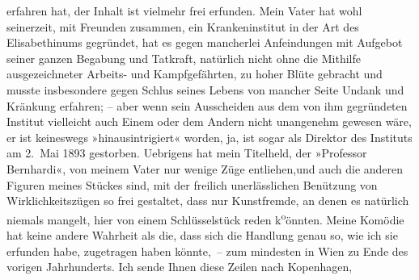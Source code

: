 \begin{ledgroupsized}[t]{13cm}
               erfahren hat, der Inhalt ist vielmehr frei erfunden. Mein {\pb}Vater hat wohl seinerzeit, mit
               Freunden zusammen, ein Krankeninstitut in der Art des Elisabethinums gegründet, hat es gegen
               mancherlei Anfeindungen mit Aufgebot seiner ganzen Begabung und Tatkraft, natürlich
               nicht ohne die Mithilfe ausgezeichneter Arbeits- und Kampfgefährten, zu hoher Blüte
               gebracht und musste insbesondere gegen Schlus seines Lebens von mancher Seite Undank
               und Kränkung erfahren; – aber wenn sein Ausscheiden aus dem von ihm gegründeten
               Institut vielleicht auch Einem oder dem Andern nicht unangenehm gewesen wäre, er ist
               keineswegs »hinausintrigiert« worden, ja,  ist
               sogar als Direktor des Instituts am
                  2. Mai 1893 gestorben. Uebrigens hat mein Titelheld, der »Professor Bernhardi«, von meinem
                  Vater nur wenige Züge
               entliehen,und auch die anderen Figuren meines Stückes sind, mit der freilich
               unerlässlichen Benützung von Wirklichkeitszügen so frei gestaltet, dass nur
               Kunstfremde, an denen es natürlich {\pb}niemals
               mangelt, hier von einem Schlüsselstück reden k\substVorne{}\textsuperscript{o}\substDazwischen{}ö\substHinten{}nnten. Meine Komödie hat
               keine andere Wahrheit als die, dass sich die Handlung genau so, wie ich sie
                  erfunden\strikeout{,} habe, zugetragen haben könnte, – zum
               mindesten in Wien zu Ende des vorigen
               Jahrhunderts.\pend
           \pstart
           Ich sende Ihnen diese Zeilen nach Kopenhagen,

\end{ledgroupsized}
